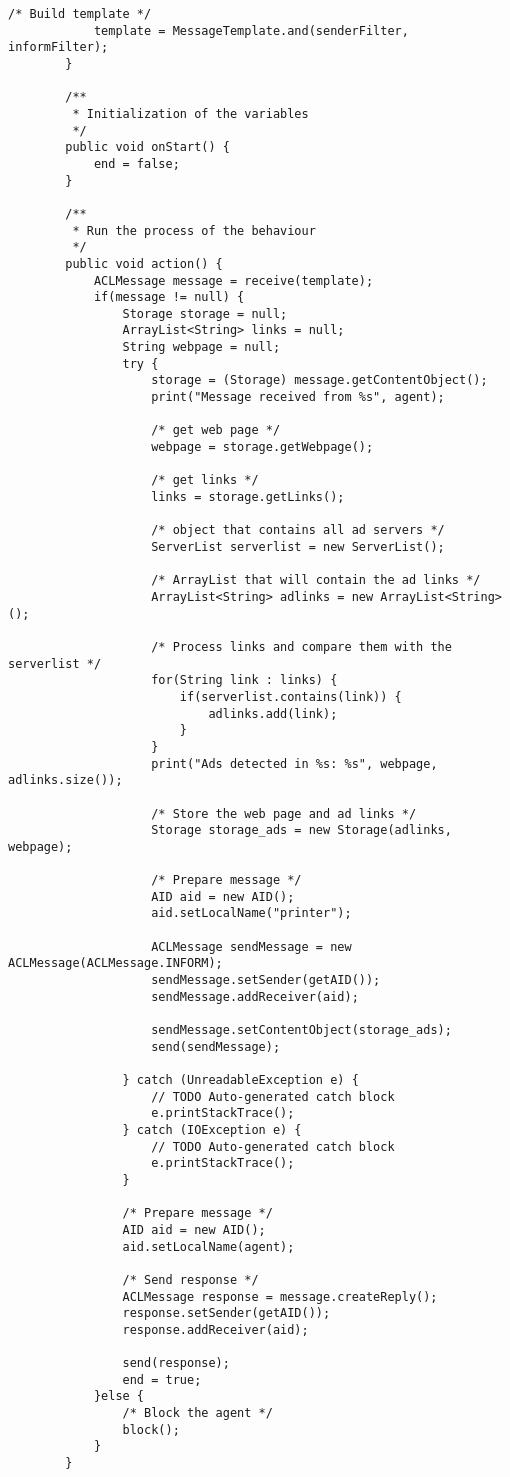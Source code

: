 \documentclass{pre-tfg}
\begin{document}
\begin{lstlisting}[caption=Código de extracción de anuncios de varios links de una URL,style=java]
			/* Build template */
			template = MessageTemplate.and(senderFilter, informFilter);
		}

		/**
		 * Initialization of the variables
		 */
		public void onStart() {
			end = false;
		}

		/**
		 * Run the process of the behaviour
		 */
		public void action() {
			ACLMessage message = receive(template);
			if(message != null) {
				Storage storage = null;
				ArrayList<String> links = null;
				String webpage = null;
				try {
					storage = (Storage) message.getContentObject();
					print("Message received from %s", agent);

					/* get web page */
					webpage = storage.getWebpage();

					/* get links */
					links = storage.getLinks();

					/* object that contains all ad servers */
					ServerList serverlist = new ServerList();

					/* ArrayList that will contain the ad links */
					ArrayList<String> adlinks = new ArrayList<String>();

					/* Process links and compare them with the serverlist */
					for(String link : links) {
						if(serverlist.contains(link)) {
							adlinks.add(link);
						}
					}					
					print("Ads detected in %s: %s", webpage, adlinks.size());

					/* Store the web page and ad links */
					Storage storage_ads = new Storage(adlinks, webpage);

					/* Prepare message */
					AID aid = new AID();
					aid.setLocalName("printer");

					ACLMessage sendMessage = new ACLMessage(ACLMessage.INFORM);
					sendMessage.setSender(getAID());
					sendMessage.addReceiver(aid);

					sendMessage.setContentObject(storage_ads);
					send(sendMessage);

				} catch (UnreadableException e) {
					// TODO Auto-generated catch block
					e.printStackTrace();
				} catch (IOException e) {
					// TODO Auto-generated catch block
					e.printStackTrace();
				}

				/* Prepare message */
				AID aid = new AID();
				aid.setLocalName(agent);

				/* Send response */
				ACLMessage response = message.createReply();
				response.setSender(getAID());
				response.addReceiver(aid);

				send(response);
				end = true;
			}else {
				/* Block the agent */
				block();
			}
		}


\end{lstlisting}
\end{document}
